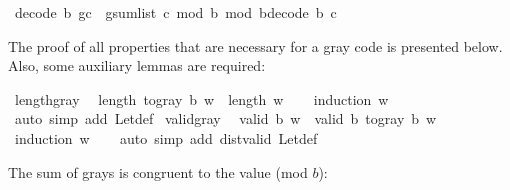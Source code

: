 \begin{isabellebody}
{\isacharbar}{\kern0pt}\ {\isachardoublequoteopen}decode\ b\ {\isacharparenleft}{\kern0pt}g{\isacharhash}{\kern0pt}c{\isacharparenright}{\kern0pt}\ {\isacharequal}{\kern0pt}\ {\isacharparenleft}{\kern0pt}g{\isacharplus}{\kern0pt}sum{\isacharunderscore}{\kern0pt}list\ c\ mod\ b{\isacharparenright}{\kern0pt}\ mod\ b{\isacharhash}{\kern0pt}decode\ b\ c{\isachardoublequoteclose}%
\isadelimdocument
%
\endisadelimdocument
%
\isatagdocument
%
\isamarkuptrue%
%
\endisatagdocument
{\isafolddocument}%
%
\isadelimdocument
%
\endisadelimdocument
%
\begin{isamarkuptext}%
The proof of all properties that are necessary for a gray code
  is presented below. Also, some auxiliary lemmas are required:%
\end{isamarkuptext}\isamarkuptrue%
\isamarkupfalse%
\ length{\isacharunderscore}{\kern0pt}gray{\isacharcolon}{\kern0pt}\isanewline
\ \ {\isachardoublequoteopen}length\ {\isacharparenleft}{\kern0pt}to{\isacharunderscore}{\kern0pt}gray\ b\ w{\isacharparenright}{\kern0pt}\ {\isacharequal}{\kern0pt}\ length\ w{\isachardoublequoteclose}\isanewline
%
\isadelimproof
\ \ %
\endisadelimproof
%
\isatagproof
{}\isamarkupfalse%
\ {\isacharparenleft}{\kern0pt}induction\ w{\isacharparenright}{\kern0pt}\isanewline
\ \ \isamarkupfalse%
\ {\isacharparenleft}{\kern0pt}auto\ simp\ add{\isacharcolon}{\kern0pt}\ Let{\isacharunderscore}{\kern0pt}def{\isacharparenright}{\kern0pt}%
\endisatagproof
{\isafoldproof}%
%
\isadelimproof
\isanewline
%
\endisadelimproof
\isanewline
{}\isamarkupfalse%
\ valid{\isacharunderscore}{\kern0pt}gray{\isacharcolon}{\kern0pt}\isanewline
\ \ {\isachardoublequoteopen}valid\ b\ w\ {\isasymLongrightarrow}\ valid\ b\ {\isacharparenleft}{\kern0pt}to{\isacharunderscore}{\kern0pt}gray\ b\ w{\isacharparenright}{\kern0pt}{\isachardoublequoteclose}\isanewline
%
\isadelimproof
\ \ %
\endisadelimproof
%
\isatagproof
{}\isamarkupfalse%
\ {\isacharparenleft}{\kern0pt}induction\ w{\isacharparenright}{\kern0pt}\isanewline
\ \ \isamarkupfalse%
\ {\isacharparenleft}{\kern0pt}auto\ simp\ add{\isacharcolon}{\kern0pt}\ dist{}{\isacharunderscore}{\kern0pt}valid\ Let{\isacharunderscore}{\kern0pt}def{\isacharparenright}{\kern0pt}%
\endisatagproof
{\isafoldproof}%
%
\isadelimproof
%
\endisadelimproof
%
\begin{isamarkuptext}%
The sum of grays is congruent to the value (mod $b$):%
\end{isamarkuptext}\isamarkuptrue%

\end{isabellebody}
